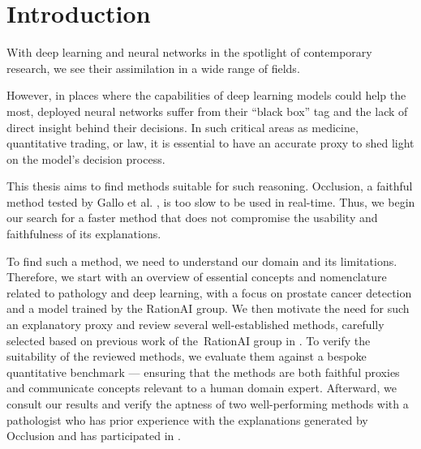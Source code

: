 \chapter{Introduction}\label{chap:introduction}

With deep learning and neural networks in the spotlight of contemporary research, we see their assimilation in a wide range of fields.

However, in places where the capabilities of deep learning models could help the most, deployed neural networks suffer from their ``black box'' tag and the lack of direct insight behind their decisions. In such critical areas as medicine, quantitative trading, or law, it is essential to have an accurate proxy to shed light on the model's decision process. 

This thesis aims to find methods suitable for such reasoning.
Occlusion, a faithful method tested by Gallo et al. \cite{gallo}, is too slow to be used in real-time.
Thus, we begin our search for a faster method that does not compromise the usability and faithfulness of its explanations.

To find such a method, we need to understand our domain and its limitations.
Therefore, we start with an overview of essential concepts and nomenclature related to pathology and deep learning, with a focus on prostate cancer detection and a model trained by the RationAI group.
We then motivate the need for such an explanatory proxy and review several well-established methods, carefully selected based on previous work of the~RationAI group in  \cite{gallo, bajger-grad-cam, krajnansky-grad-cam, hruska-grad-cam}.
To verify the suitability of the reviewed methods, we evaluate them against a bespoke quantitative benchmark --- ensuring that the methods are both faithful proxies and communicate concepts relevant to a human domain expert.
Afterward, we consult our results and verify the aptness of two well-performing methods with a pathologist who has prior experience with the explanations generated by Occlusion and has participated in \cite{gallo}.
